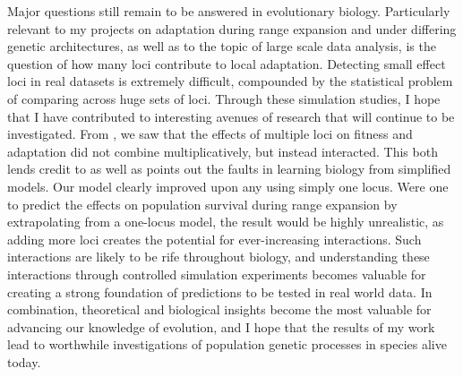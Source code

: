 Major questions still remain to be answered in evolutionary biology. Particularly relevant to my projects on adaptation during range expansion and under differing genetic architectures, as well as to the topic of large scale data analysis, is the question of how many loci contribute to local adaptation. Detecting small effect loci in real datasets is extremely difficult, compounded by the statistical problem of comparing across huge sets of loci. Through these simulation studies, I hope that I have contributed to interesting avenues of research that will continue to be investigated. From , we saw that the effects of multiple loci on fitness and adaptation did not combine multiplicatively, but instead interacted. This both lends credit to as well as points out the faults in learning biology from simplified models. Our model clearly improved upon any using simply one locus. Were one to predict the effects on population survival during range expansion by extrapolating from a one-locus model, the result would be highly unrealistic, as adding more loci creates the potential for ever-increasing interactions. Such interactions are likely to be rife throughout biology, and understanding these interactions through controlled simulation experiments becomes valuable for creating a strong foundation of predictions to be tested in real world data. In combination, theoretical and biological insights become the most valuable for advancing our knowledge of evolution, and I hope that the results of my work lead to worthwhile investigations of population genetic processes in species alive today.




